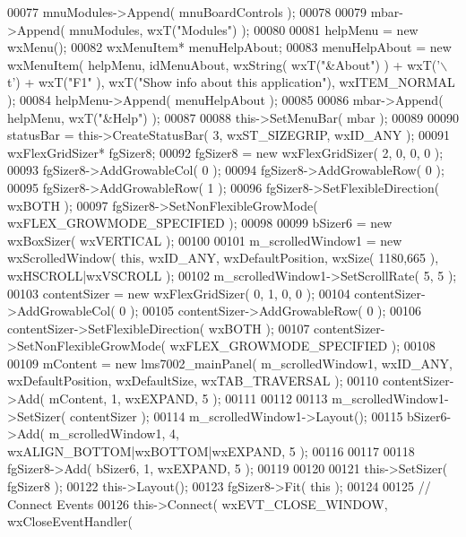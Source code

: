 \begin{DoxyCode}
00077     mnuModules->Append( mnuBoardControls );
00078     
00079     mbar->Append( mnuModules, wxT(\textcolor{stringliteral}{"Modules"}) ); 
00080     
00081     helpMenu = \textcolor{keyword}{new} wxMenu();
00082     wxMenuItem* menuHelpAbout;
00083     menuHelpAbout = \textcolor{keyword}{new} wxMenuItem( helpMenu, idMenuAbout, wxString( wxT(\textcolor{stringliteral}{"&About"}) ) + wxT(\textcolor{charliteral}{'\(\backslash\)t'}) + wxT(\textcolor{stringliteral}{"F1"}
      ), wxT(\textcolor{stringliteral}{"Show info about this application"}), wxITEM\_NORMAL );
00084     helpMenu->Append( menuHelpAbout );
00085     
00086     mbar->Append( helpMenu, wxT(\textcolor{stringliteral}{"&Help"}) ); 
00087     
00088     this->SetMenuBar( mbar );
00089     
00090     statusBar = this->CreateStatusBar( 3, wxST\_SIZEGRIP, wxID\_ANY );
00091     wxFlexGridSizer* fgSizer8;
00092     fgSizer8 = \textcolor{keyword}{new} wxFlexGridSizer( 2, 0, 0, 0 );
00093     fgSizer8->AddGrowableCol( 0 );
00094     fgSizer8->AddGrowableRow( 0 );
00095     fgSizer8->AddGrowableRow( 1 );
00096     fgSizer8->SetFlexibleDirection( wxBOTH );
00097     fgSizer8->SetNonFlexibleGrowMode( wxFLEX\_GROWMODE\_SPECIFIED );
00098     
00099     bSizer6 = \textcolor{keyword}{new} wxBoxSizer( wxVERTICAL );
00100     
00101     m_scrolledWindow1 = \textcolor{keyword}{new} wxScrolledWindow( \textcolor{keyword}{this}, wxID\_ANY, wxDefaultPosition, wxSize( 1180,665 ), 
      wxHSCROLL|wxVSCROLL );
00102     m_scrolledWindow1->SetScrollRate( 5, 5 );
00103     contentSizer = \textcolor{keyword}{new} wxFlexGridSizer( 0, 1, 0, 0 );
00104     contentSizer->AddGrowableCol( 0 );
00105     contentSizer->AddGrowableRow( 0 );
00106     contentSizer->SetFlexibleDirection( wxBOTH );
00107     contentSizer->SetNonFlexibleGrowMode( wxFLEX\_GROWMODE\_SPECIFIED );
00108     
00109     mContent = \textcolor{keyword}{new} lms7002_mainPanel( m_scrolledWindow1, wxID\_ANY, wxDefaultPosition, wxDefaultSize, 
      wxTAB\_TRAVERSAL );
00110     contentSizer->Add( mContent, 1, wxEXPAND, 5 );
00111     
00112     
00113     m_scrolledWindow1->SetSizer( contentSizer );
00114     m_scrolledWindow1->Layout();
00115     bSizer6->Add( m_scrolledWindow1, 4, wxALIGN\_BOTTOM|wxBOTTOM|wxEXPAND, 5 );
00116     
00117     
00118     fgSizer8->Add( bSizer6, 1, wxEXPAND, 5 );
00119     
00120     
00121     this->SetSizer( fgSizer8 );
00122     this->Layout();
00123     fgSizer8->Fit( \textcolor{keyword}{this} );
00124     
00125     \textcolor{comment}{// Connect Events}
00126     this->Connect( wxEVT\_CLOSE\_WINDOW, wxCloseEventHandler( 

\end{DoxyCode}

